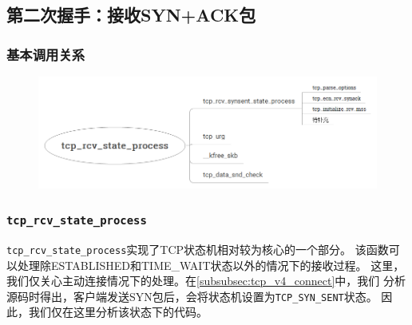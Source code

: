 \subsection{第二次握手：接收SYN+ACK包}
\label{subsec:recv_synack}

    \subsubsection{基本调用关系}

                \begin{figure}[htb]        
                    \centering
                    \includegraphics[width=\textwidth]  {images/Client:Receive SYN +ACK.png}
                \end{figure} 

    \subsubsection{\texttt{tcp_rcv_state_process}}
        \texttt{tcp_rcv_state_process}实现了TCP状态机相对较为核心的一个部分。
        该函数可以处理除ESTABLISHED和TIME\_WAIT状态以外的情况下的接收过程。
        这里，我们仅关心主动连接情况下的处理。在\ref{subsubsec:tcp_v4_connect}中，我们
        分析源码时得出，客户端发送SYN包后，会将状态机设置为\texttt{TCP_SYN_SENT}状态。
        因此，我们仅在这里分析该状态下的代码。

